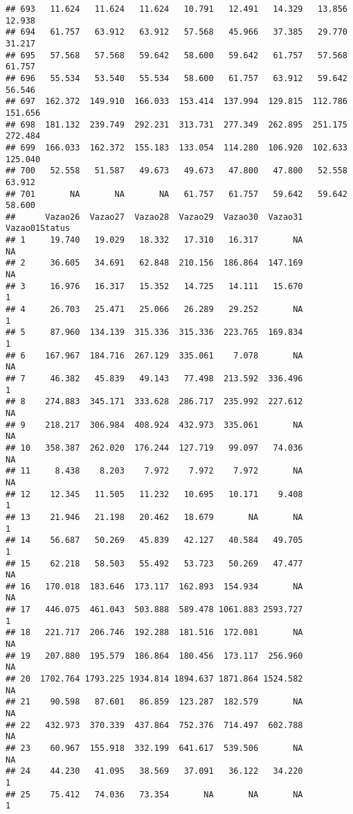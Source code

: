 \documentclass[
]{article}
\begin{document}
\begin{verbatim}
## 693   11.624   11.624   11.624   10.791   12.491   14.329   13.856   12.938
## 694   61.757   63.912   63.912   57.568   45.966   37.385   29.770   31.217
## 695   57.568   57.568   59.642   58.600   59.642   61.757   57.568   61.757
## 696   55.534   53.540   55.534   58.600   61.757   63.912   59.642   56.546
## 697  162.372  149.910  166.033  153.414  137.994  129.815  112.786  151.656
## 698  181.132  239.749  292.231  313.731  277.349  262.895  251.175  272.484
## 699  166.033  162.372  155.183  133.054  114.280  106.920  102.633  125.040
## 700   52.558   51.587   49.673   49.673   47.800   47.800   52.558   63.912
## 701       NA       NA       NA   61.757   61.757   59.642   59.642   58.600
##      Vazao26  Vazao27  Vazao28  Vazao29  Vazao30  Vazao31 Vazao01Status
## 1     19.740   19.029   18.332   17.310   16.317       NA            NA
## 2     36.605   34.691   62.848  210.156  186.864  147.169            NA
## 3     16.976   16.317   15.352   14.725   14.111   15.670             1
## 4     26.703   25.471   25.066   26.289   29.252       NA             1
## 5     87.960  134.139  315.336  315.336  223.765  169.834             1
## 6    167.967  184.716  267.129  335.061    7.078       NA            NA
## 7     46.382   45.839   49.143   77.498  213.592  336.496             1
## 8    274.883  345.171  333.628  286.717  235.992  227.612            NA
## 9    218.217  306.984  408.924  432.973  335.061       NA            NA
## 10   358.387  262.020  176.244  127.719   99.097   74.036            NA
## 11     8.438    8.203    7.972    7.972    7.972       NA            NA
## 12    12.345   11.505   11.232   10.695   10.171    9.408             1
## 13    21.946   21.198   20.462   18.679       NA       NA             1
## 14    56.687   50.269   45.839   42.127   40.584   49.705             1
## 15    62.218   58.503   55.492   53.723   50.269   47.477            NA
## 16   170.018  183.646  173.117  162.893  154.934       NA            NA
## 17   446.075  461.043  503.888  589.478 1061.883 2593.727             1
## 18   221.717  206.746  192.288  181.516  172.081       NA            NA
## 19   207.880  195.579  186.864  180.456  173.117  256.960            NA
## 20  1702.764 1793.225 1934.814 1894.637 1871.864 1524.582            NA
## 21    90.598   87.601   86.859  123.287  182.579       NA            NA
## 22   432.973  370.339  437.864  752.376  714.497  602.788            NA
## 23    60.967  155.918  332.199  641.617  539.506       NA            NA
## 24    44.230   41.095   38.569   37.091   36.122   34.220             1
## 25    75.412   74.036   73.354       NA       NA       NA             1

\end{verbatim}
\end{document}
